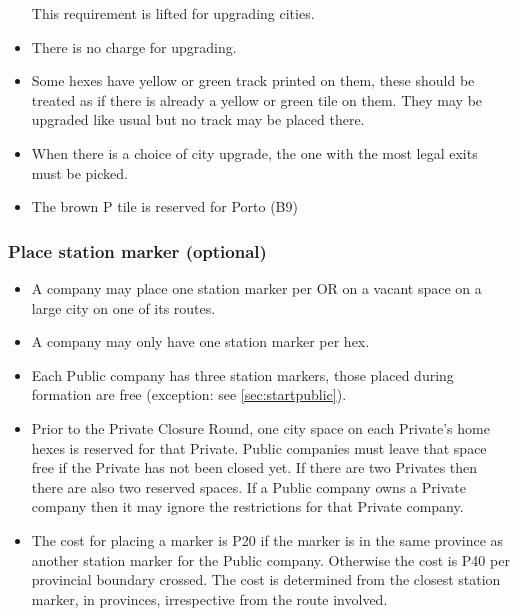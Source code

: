 \documentclass[a4paper,twocolumn]{article}
\begin{document}
\begin{itemize}
	This requirement is lifted for upgrading cities.
	\item There is no charge for upgrading.
	\item Some hexes have yellow or green track printed on them, these should be
	treated as if there is already a yellow or green tile on them. They may be
	upgraded like usual but no track may be placed there.
	\item When there is a choice of city upgrade, the one with the most legal
	exits must be picked.
	\item The brown P tile is reserved for Porto (B9)
\end{itemize}

\subsubsection{Place station marker (optional)}
\begin{itemize}
	\item A company may place one station marker per OR on a vacant space on a
	large city on one of its routes.
	\item A company may only have one station marker per hex.
	\item Each Public company has three station markers, those placed during
	formation are free (exception: see \autoref{sec:startpublic}).
	\item Prior to the Private Closure Round, one city space on each Private's
	home hexes is reserved for that Private. Public companies must leave that
	space free if the Private has not been closed yet. If there are two Privates
	then there are also two reserved spaces. If a Public company owns a Private
	company then it may ignore the restrictions for that Private company.
	\item The cost for placing a marker is P20 if the marker is in the same
	province as another station marker for the Public company. Otherwise the
	cost is P40 per provincial boundary crossed. The cost is determined from the
	closest station marker, in provinces, irrespective from the route involved.
\end{itemize}
\end{document}
